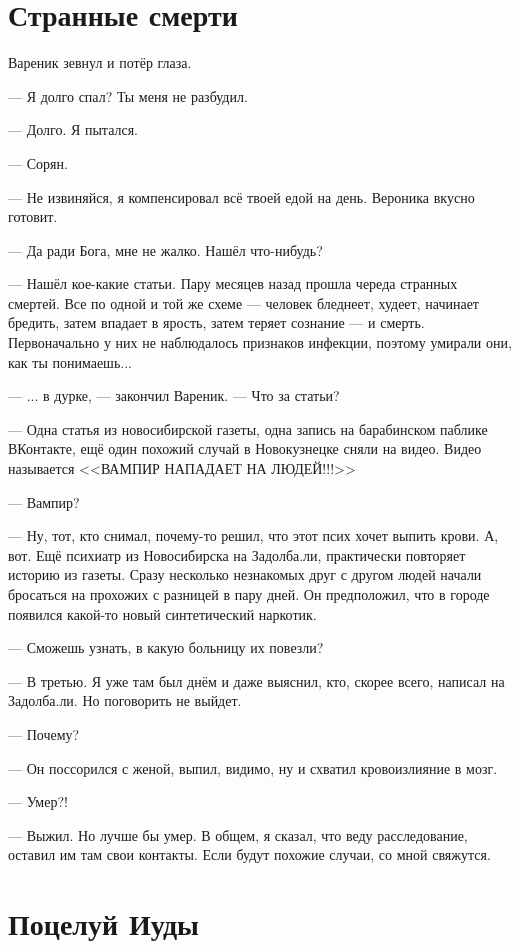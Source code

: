 \documentclass[a4paper,10pt,fleqn]{book}\usepackage{polyglossia}\setdefaultlanguage{english}\setotherlanguage{russian}\defaultfontfeatures{Ligatures=TeX,Mapping=tex-text} \usepackage{xcolor}\definecolor{lightgray}{HTML}{bbbbbb}\color{lightgray}\newcommand{\ml}[3]{\textcolor{black}{#3}}
\begin{document}
\section{Странные смерти}

Вареник зевнул и потёр глаза.

--- Я долго спал?
Ты меня не разбудил.

--- Долго.
Я пытался.

--- Сорян.

--- Не извиняйся, я компенсировал всё твоей едой на день.
Вероника вкусно готовит.

--- Да ради Бога, мне не жалко.
Нашёл что-нибудь?

--- Нашёл кое-какие статьи.
Пару месяцев назад прошла череда странных смертей.
Все по одной и той же схеме --- человек бледнеет, худеет, начинает бредить, затем впадает в ярость, затем теряет сознание --- и смерть.
Первоначально у них не наблюдалось признаков инфекции, поэтому умирали они, как ты понимаешь...

---  ... в дурке, --- закончил Вареник.
--- Что за статьи?

--- Одна статья из новосибирской газеты, одна запись на барабинском паблике ВКонтакте, ещё один похожий случай в Новокузнецке сняли на видео.
Видео называется <<ВАМПИР НАПАДАЕТ НА ЛЮДЕЙ!!!>>

--- Вампир?

--- Ну, тот, кто снимал, почему-то решил, что этот псих хочет выпить крови.
А, вот.
Ещё психиатр из Новосибирска на Задолба.ли, практически повторяет историю из газеты.
Сразу несколько незнакомых друг с другом людей начали бросаться на прохожих с разницей в пару дней.
Он предположил, что в городе появился какой-то новый синтетический наркотик.

--- Сможешь узнать, в какую больницу их повезли?

--- В третью.
Я уже там был днём и даже выяснил, кто, скорее всего, написал на Задолба.ли.
Но поговорить не выйдет.

--- Почему?

--- Он поссорился с женой, выпил, видимо, ну и схватил кровоизлияние в мозг.

--- Умер?!

--- Выжил.
Но лучше бы умер.
В общем, я сказал, что веду расследование, оставил им там свои контакты.
Если будут похожие случаи, со мной свяжутся.

\section{Поцелуй Иуды}
\end{document}
